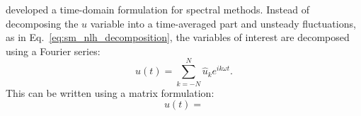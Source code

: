 \citet{Hall2002} developed a time-domain formulation for spectral
methods. Instead of decomposing the $u$ variable into a time-averaged
part and unsteady fluctuations, as in Eq.~\ref{eq:sm_nlh_decomposition},
the variables of interest are decomposed using a Fourier series:
\begin{equation}
	u (t) = \sum_{k=-N}^{N} \widehat{u}_k e^{i k \omega t}.
	\label{eq:sm_hbt_decomposition}
\end{equation}
This can be written using a matrix formulation:
\begin{equation}
	u (t) = 
\end{equation}





